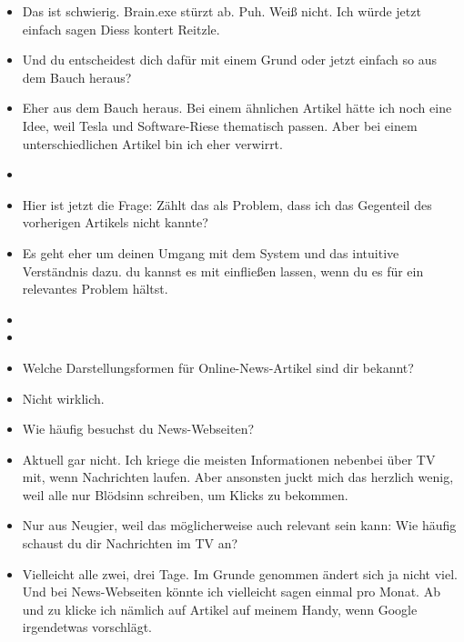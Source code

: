 {\begin{itemize}[]
            \item {} Das ist schwierig.
                  Brain.exe stürzt ab.
                  Puh.
                  Weiß nicht.
                  Ich würde jetzt einfach sagen Diess kontert Reitzle.
            \item {} Und du entscheidest dich dafür mit einem Grund oder jetzt einfach so aus dem Bauch heraus?
            \item {} Eher aus dem Bauch heraus.
                  Bei einem ähnlichen Artikel hätte ich noch eine Idee, weil Tesla und Software-Riese thematisch passen.
                  Aber bei einem unterschiedlichen Artikel bin ich eher verwirrt.
            \item {}
            \item {} Hier ist jetzt die Frage: Zählt das als Problem, dass ich das Gegenteil des vorherigen Artikels nicht kannte?
            \item {} Es geht eher um deinen Umgang mit dem System und das intuitive Verständnis dazu.
                  du kannst es mit einfließen lassen, wenn du es für ein relevantes Problem hältst.
            \item {}
            \item {}
            \item {} Welche Darstellungsformen für Online-News-Artikel sind dir bekannt?
            \item {} Nicht wirklich.
            \item {} Wie häufig besuchst du News-Webseiten?
            \item {} Aktuell gar nicht.
                  Ich kriege die meisten Informationen nebenbei über TV mit, wenn Nachrichten laufen.
                  Aber ansonsten juckt mich das herzlich wenig, weil alle nur Blödsinn schreiben, um Klicks zu bekommen.
            \item {} Nur aus Neugier, weil das möglicherweise auch relevant sein kann: Wie häufig schaust du dir Nachrichten im TV an?
            \item {} Vielleicht alle zwei, drei Tage. Im Grunde genommen ändert sich ja nicht viel.
                  Und bei News-Webseiten könnte ich vielleicht sagen einmal pro Monat.
                  Ab und zu klicke ich nämlich auf Artikel auf meinem Handy, wenn Google irgendetwas vorschlägt.

\end{itemize}}

